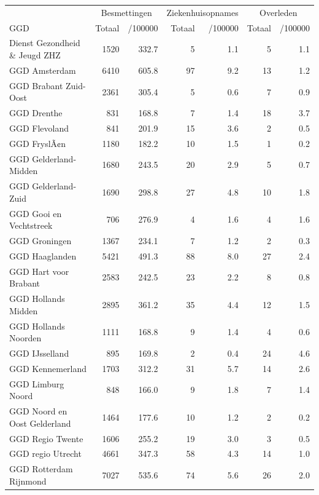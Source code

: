 \documentclass[
  english,
  man,floatsintext]{apa6}
\begin{document}
\begin{table}[H]
\centering\begingroup\fontsize{10}{12}\selectfont

\begin{threeparttable}
\begin{tabular}{lrrrrrr}
\toprule
\multicolumn{1}{c}{ } & \multicolumn{2}{c}{Besmettingen} & \multicolumn{2}{c}{Ziekenhuisopnames} & \multicolumn{2}{c}{Overleden} \\
\cmidrule(l{3pt}r{3pt}){2-3} \cmidrule(l{3pt}r{3pt}){4-5} \cmidrule(l{3pt}r{3pt}){6-7}
GGD & Totaal & /100000 & Totaal & /100000 & Totaal & /100000\\
\midrule
Dienst Gezondheid \& Jeugd ZHZ & 1520 & 332.7 & 5 & 1.1 & 5 & 1.1\\
GGD Amsterdam & 6410 & 605.8 & 97 & 9.2 & 13 & 1.2\\
GGD Brabant Zuid-Oost & 2361 & 305.4 & 5 & 0.6 & 7 & 0.9\\
GGD Drenthe & 831 & 168.8 & 7 & 1.4 & 18 & 3.7\\
GGD Flevoland & 841 & 201.9 & 15 & 3.6 & 2 & 0.5\\
GGD FryslÃ¢n & 1180 & 182.2 & 10 & 1.5 & 1 & 0.2\\
GGD Gelderland-Midden & 1680 & 243.5 & 20 & 2.9 & 5 & 0.7\\
GGD Gelderland-Zuid & 1690 & 298.8 & 27 & 4.8 & 10 & 1.8\\
GGD Gooi en Vechtstreek & 706 & 276.9 & 4 & 1.6 & 4 & 1.6\\
GGD Groningen & 1367 & 234.1 & 7 & 1.2 & 2 & 0.3\\
GGD Haaglanden & 5421 & 491.3 & 88 & 8.0 & 27 & 2.4\\
GGD Hart voor Brabant & 2583 & 242.5 & 23 & 2.2 & 8 & 0.8\\
GGD Hollands Midden & 2895 & 361.2 & 35 & 4.4 & 12 & 1.5\\
GGD Hollands Noorden & 1111 & 168.8 & 9 & 1.4 & 4 & 0.6\\
GGD IJsselland & 895 & 169.8 & 2 & 0.4 & 24 & 4.6\\
GGD Kennemerland & 1703 & 312.2 & 31 & 5.7 & 14 & 2.6\\
GGD Limburg Noord & 848 & 166.0 & 9 & 1.8 & 7 & 1.4\\
GGD Noord en Oost Gelderland & 1464 & 177.6 & 10 & 1.2 & 2 & 0.2\\
GGD Regio Twente & 1606 & 255.2 & 19 & 3.0 & 3 & 0.5\\
GGD regio Utrecht & 4661 & 347.3 & 58 & 4.3 & 14 & 1.0\\
GGD Rotterdam Rijnmond & 7027 & 535.6 & 74 & 5.6 & 26 & 2.0\\

\end{tabular}
\end{threeparttable}
\end{table}
\end{document}
